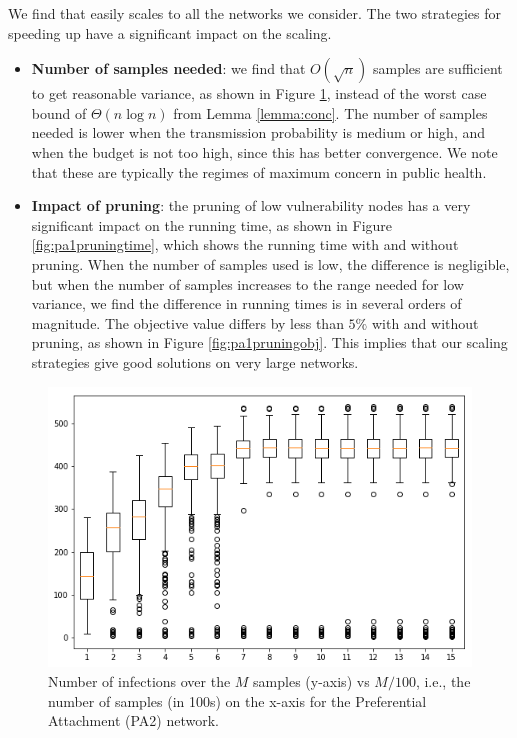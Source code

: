We find that \algo{} easily scales to all the networks we consider. The two strategies for speeding up have a
significant impact on the scaling.
\begin{itemize}
\item
\textbf{Number of samples needed}: we find that $O(\sqrt{n})$ samples are sufficient to get reasonable variance, as shown in Figure \ref{fig:pa_boxplot},
instead of the worst case bound of $\Theta(n\log{n})$ from Lemma \ref{lemma:conc}.
The number of samples needed is lower when the transmission probability is medium or high, and when the budget is not too high,
since this has better convergence. We note that these are typically the regimes of maximum concern in public health.
\item
\textbf{Impact of pruning}: the pruning of low vulnerability nodes has a very significant impact on the running time,
as shown in Figure \ref{fig:pa1pruningtime}, which shows the running time with and without pruning. 
When the number of samples used is low, the difference is negligible, but when the number of samples increases to
the range needed for low variance, we find the difference in running times is in several orders of magnitude.
The objective value differs by less than $5\%$ with and without pruning, as shown in Figure \ref{fig:pa1pruningobj}.
This implies that our scaling strategies give good solutions on very large networks.
\end{itemize}
 
\begin{figure}[!h]
    \centering
    \includegraphics[scale = 0.4]{Figuresnew/boxplotpa.png}
    \caption{Number of infections over the $M$ samples (y-axis) vs $M/100$, i.e., the number of samples (in 100s) on the x-axis
for the Preferential Attachment (PA2) network.
}
    \label{fig:pa_boxplot}
\end{figure}


